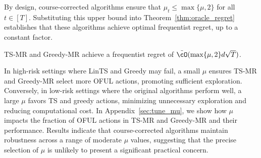 By design, course-corrected algorithms ensure that $\mu_t \leq \max\{\mu,2\}$ for all $t \in [T]$. Substituting this upper bound into Theorem~\ref{thm:oracle_regret} establishes that these algorithms achieve optimal frequentist regret, up to a constant factor.
\begin{corollary} TS-MR and Greedy-MR achieve a frequentist regret of
$\tilde{\cO}( \max\{\mu,2\} d \sqrt{T})$.
\end{corollary}


In high-risk settings where LinTS and Greedy may fail, a small $\mu$ ensures TS-MR and Greedy-MR select more OFUL actions, promoting sufficient exploration. Conversely, in low-risk settings where the original algorithms perform well, a large $\mu$ favors TS and greedy actions, minimizing unnecessary exploration and reducing computational cost. In Appendix~\ref{sec:tune_mu}, we show how $\mu$ impacts the fraction of OFUL actions in TS-MR and Greedy-MR and their performance. Results indicate that course-corrected algorithms maintain robustness across a range of moderate $\mu$ values, suggesting that the precise selection of $\mu$ is unlikely to present a significant practical concern.










